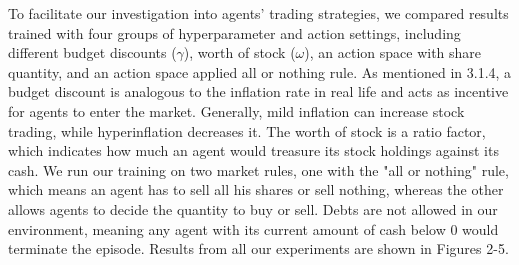 \documentclass{article}
\begin{document}



To facilitate our investigation into agents' trading strategies, we compared results trained with four groups of hyperparameter and action settings, including different budget discounts ($\gamma$), worth of stock ($\omega$), an action space with share quantity, and an action space applied all or nothing rule. As mentioned in 3.1.4, a budget discount is analogous to the inflation rate in real life and acts as incentive for agents to enter the market. Generally, mild inflation can increase stock trading, while hyperinflation decreases it. The worth of stock is a ratio factor, which indicates how much an agent would treasure its stock holdings against its cash. We run our training on two market rules, one with the "all or nothing" rule, which means an agent has to sell all his shares or sell nothing, whereas the other allows agents to decide the quantity to buy or sell. Debts are not allowed in our environment, meaning any agent with its current amount of cash below 0 would terminate the episode.
Results from all our experiments are shown in Figures 2-5.
\end{document}
